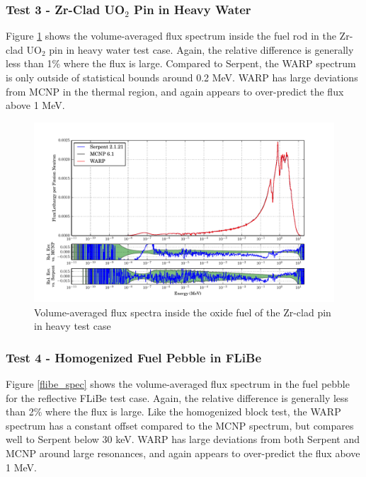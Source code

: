\documentclass[preprint,12pt]{elsarticle}
\begin{document}
\newpage
\subsubsection{Test 3 - Zr-Clad UO$_2$ Pin in Heavy Water}

Figure \ref{pincell_spec} shows the volume-averaged flux spectrum inside the fuel rod in the Zr-clad UO$_2$ pin in heavy water test case.  Again, the relative difference is generally less than 1\% where the flux is large.  Compared to Serpent, the WARP spectrum is only outside of statistical bounds around 0.2 MeV.   WARP has large deviations from MCNP in the thermal region, and again appears to over-predict the flux above 1 MeV.

\begin{figure}[h!]
\centering
\includegraphics[width=\textwidth,trim= 1cm 0cm 1cm 0cm]{graphics/pincell_spec.pdf}
\caption{Volume-averaged flux spectra inside the oxide fuel of the Zr-clad pin in heavy test case \label{pincell_spec} }
\end{figure}

\newpage
\subsubsection{Test 4 - Homogenized Fuel Pebble in FLiBe}

Figure \ref{flibe_spec} shows the volume-averaged flux spectrum in the fuel pebble for the reflective FLiBe test case.  Again, the relative difference is generally less than 2\% where the flux is large.  Like the homogenized block test, the WARP spectrum has a constant offset compared to the MCNP spectrum, but compares well to Serpent below 30 keV. WARP has large deviations from both Serpent and MCNP around large resonances, and again appears to over-predict the flux above 1 MeV.
\end{document}

